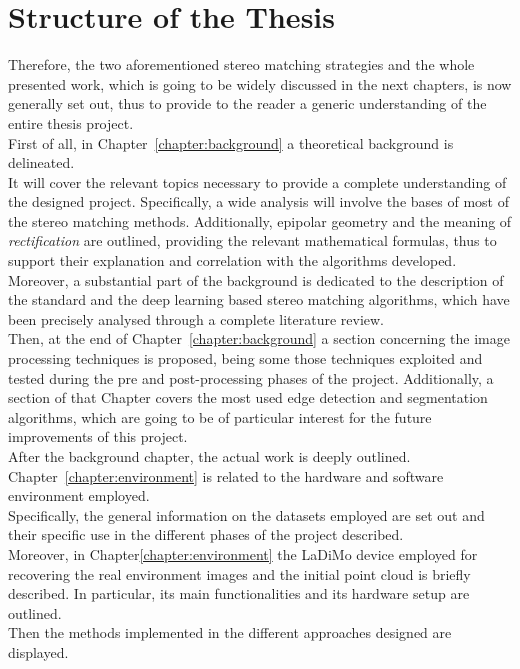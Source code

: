 \section{Structure of the Thesis}
\label{section:structure-of-thesis} 

Therefore, the two aforementioned stereo matching strategies and the whole presented work, which is going to be widely discussed in the next chapters, is now generally set out, thus to provide to the reader a generic understanding of the entire thesis project. \\ 
First of all, in Chapter~\ref{chapter:background} a theoretical background is delineated.\\
It will cover the relevant topics necessary to provide a complete understanding of the designed project.
Specifically, a wide analysis will involve the bases of most of the stereo matching methods.
Additionally, epipolar geometry and the meaning of \textit{rectification} are outlined, providing the relevant mathematical formulas, thus to support their explanation and correlation with the algorithms developed. \\
Moreover, a substantial part of the background is dedicated to the description of the standard and the deep learning based stereo matching algorithms, which have been precisely analysed through a complete literature review.\\
Then, at the end of Chapter~\ref{chapter:background} a section concerning the image processing techniques is proposed, being some those techniques exploited and tested during the pre and post-processing phases of the project.
Additionally, a section of that Chapter covers the most used edge detection and segmentation algorithms, which are going to be of particular interest for the future improvements of this project.\\
After the background chapter, the actual work is deeply outlined.
Chapter~\ref{chapter:environment} is related to the hardware and software environment employed.\\
Specifically, the general information on the datasets employed are set out and their specific use in the different phases of the project described.\\
Moreover, in Chapter\ref{chapter:environment} the LaDiMo device employed for recovering the real environment images and the initial point cloud is briefly described. 
In particular, its main functionalities and its hardware setup are outlined.\\
Then the methods implemented in the different approaches designed are displayed. \\
